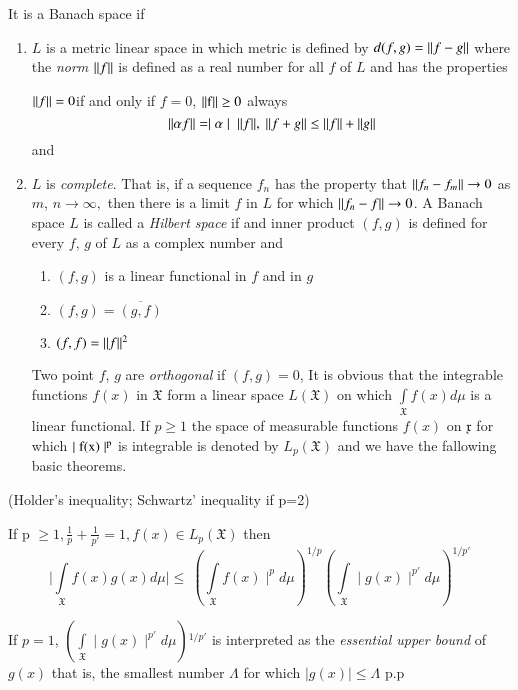 It is a Banach space if 
\begin{enumerate}
\renewcommand{\labelenumi}{(\theenumi)}
\item $L$ is a metric linear space in which metric is defined by $d(f,g) =
  \Arrowvert f - g \Arrowvert$ where the \textit{norm} $ \Arrowvert f
  \Arrowvert$ is defined as a real number for all $f$ of $L$ and has the
  properties 
  
  $\Arrowvert  f \Arrowvert = 0$\pageoriginale if and only if $f=0$, $\Arrowvert \rm
  f \Arrowvert \ge 0$ always  
  $$
  \Arrowvert \alpha f \Arrowvert =  \mid \alpha \mid~ \Arrowvert
  f \Arrowvert, ~\Arrowvert f + g \Arrowvert \le \Arrowvert
  f \Arrowvert + \Arrowvert g \Arrowvert
  $$ 
  and 
\item $L$ is \textit{complete}. That is, if a sequence $f_n$ has the property
  that $\Arrowvert f_n - f_m \Arrowvert \rightarrow 0 $ as $m$, $n
  \rightarrow  \infty,$ then there is a limit $f$ in $L$ 
  for which $\Arrowvert f_n- f \Arrowvert \rightarrow 0$. A Banach space
  $L$ is called a \textit{Hilbert space}  
  if and inner product $(f,g)$ is defined for every $f$, $g$ of $L$ as a 
  complex number and
  \begin{enumerate}[(1)]
  \item $(f, g)$ is a linear functional in $f$ and in $g$
  \item $(f,g) =  \overline {(g,f)}$
  \item $(f,f) = \Arrowvert f \Arrowvert^2$
  \end{enumerate}
  
  Two point $f$, $g$ are \textit{orthogonal} if $(f,g) = 0$, It is
  obvious that the 
  integrable functions $f(x)$ in $\mathfrak{X}$  
  form a linear space $L (\mathfrak{X})$ on which
  $\int\limits_{\mathfrak{X}} f(x)d \mu$ is a linear
  functional. If $p \ge 1$ the  
  space of measurable functions $f(x)$ on $\mathfrak{x}$ for which $\mid
  \rm f(x) \mid^p$ is integrable is denoted by $L_p(\mathfrak{X})$ 
  and we have the fallowing basic theorems.
\end{enumerate}

\begin{theorem}\label{chap1:sec16:thm37}
  (Holder's inequality; Schwartz' inequality if p=2)
  
  If p $\ge 1, \frac {1}{p} + \frac {1}{p'} = 1, f(x) \in L_p
  (\mathfrak{X})$ then 
  $$ 
  \bigg| \int\limits_{\mathfrak{X}} f(x) g(x) d \mu \bigg|\le ~
  \left(\int\limits_{\mathfrak{X}} f(x) \mid^p d \mu\right)^{1/p}
  \left(\int\limits_{\mathfrak{X}} \mid g(x) \mid^{p'} d \mu\right)^{1/{p'}} 
  $$ 
  
  If $p = 1$,  $\left(\int\limits_{\mathfrak{X}}\mid g(x) \mid^{p'} d
  \mu\right){}^{1/{p'}}$ is interpreted as the \textit{essential upper
    bound} of $g(x)$  
  that is, the smallest number $\Lambda$ for which $\mid g(x) \mid
  \le \Lambda$ p.p 
\end{theorem}

